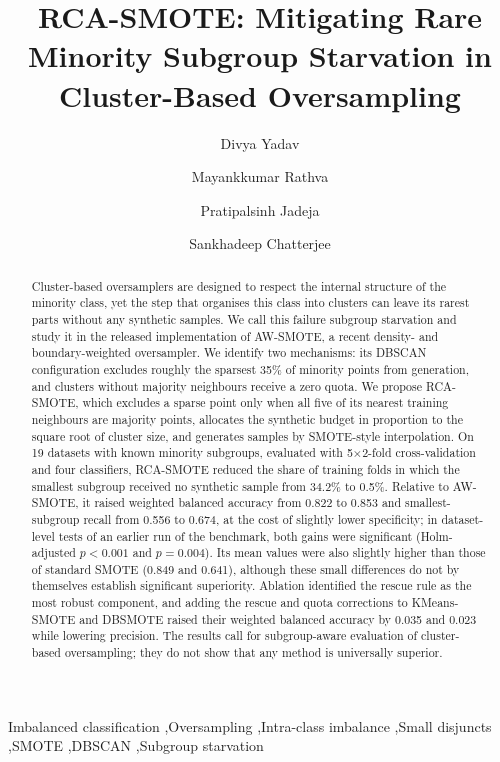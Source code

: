 \documentclass[preprint,nopreprintline]{elsarticle}
\theoremstyle{plain}
\theoremstyle{definition}
\begin{document}
\begin{frontmatter}

\title{RCA-SMOTE: Mitigating Rare Minority Subgroup Starvation in Cluster-Based Oversampling}


\author{Divya Yadav}
\author{Mayankkumar Rathva}
\author{Pratipalsinh Jadeja}
\author{Sankhadeep Chatterjee}

\begin{abstract}
Cluster-based oversamplers are designed to respect the internal structure of the minority class, yet the step that organises this class into clusters can leave its rarest parts without any synthetic samples. We call this failure subgroup starvation and study it in the released implementation of AW-SMOTE, a recent density- and boundary-weighted oversampler. We identify two mechanisms: its DBSCAN configuration excludes roughly the sparsest 35\% of minority points from generation, and clusters without majority neighbours receive a zero quota. We propose RCA-SMOTE, which excludes a sparse point only when all five of its nearest training neighbours are majority points, allocates the synthetic budget in proportion to the square root of cluster size, and generates samples by SMOTE-style interpolation. On 19 datasets with known minority subgroups, evaluated with 5$\times$2-fold cross-validation and four classifiers, RCA-SMOTE reduced the share of training folds in which the smallest subgroup received no synthetic sample from 34.2\% to 0.5\%. Relative to AW-SMOTE, it raised weighted balanced accuracy from 0.822 to 0.853 and smallest-subgroup recall from 0.556 to 0.674, at the cost of slightly lower specificity; in dataset-level tests of an earlier run of the benchmark, both gains were significant (Holm-adjusted $p<0.001$ and $p=0.004$). Its mean values were also slightly higher than those of standard SMOTE (0.849 and 0.641), although these small differences do not by themselves establish significant superiority. Ablation identified the rescue rule as the most robust component, and adding the rescue and quota corrections to KMeans-SMOTE and DBSMOTE raised their weighted balanced accuracy by 0.035 and 0.023 while lowering precision. The results call for subgroup-aware evaluation of cluster-based oversampling; they do not show that any method is universally superior.
\end{abstract}

\begin{keyword}
Imbalanced classification \sep Oversampling \sep Intra-class imbalance \sep Small disjuncts \sep SMOTE \sep DBSCAN \sep Subgroup starvation
\end{keyword}

\end{frontmatter}
\end{document}
